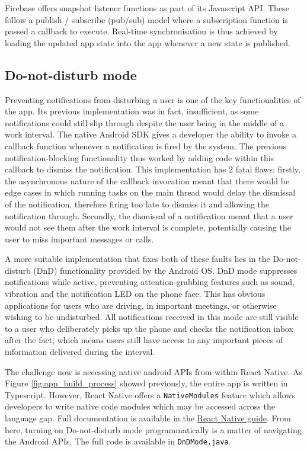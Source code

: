 Firebase offers snapshot listener functions as part of its Javascript API. These follow a publish / subscribe (pub/sub) model where a subscription function is passed a callback to execute. Real-time synchronisation is thus achieved by loading the updated app state into the app whenever a new state is published.

\subsection{Do-not-disturb mode}
Preventing notifications from disturbing a user is one of the key functionalities of the app. Its previous implementation was in fact, insufficient, as some notifications could still slip through despite the user being in the middle of a work interval. The native Android SDK gives a developer the ability to invoke a callback function whenever a notification is fired by the system. The previous notification-blocking functionality thus worked by adding code within this callback to dismiss the notification. This implementation has 2 fatal flaws: firstly, the asynchronous nature of the callback invocation meant that there would be edge cases in which running tasks on the main thread would delay the dismissal of the notification, therefore firing too late to dismiss it and allowing the notification through. Secondly, the dismissal of a notification meant that a user would not see them after the work interval is complete, potentially causing the user to miss important messages or calls.

A more suitable implementation that fixes both of these faults lies in the Do-not-disturb (DnD) functionality provided by the Android OS. DnD mode suppresses notifications while active, preventing attention-grabbing features such as sound, vibration and the notification LED on the phone face. This has obvious applications for users who are driving, in important meetings, or otherwise wishing to be undisturbed. All notifications received in this mode are still visible to a user who deliberately picks up the phone and checks the notification inbox after the fact, which means users still have access to any important pieces of information delivered during the interval.

The challenge now is accessing native android APIs from within React Native. As Figure \ref{fig:app_build_process} showed previously, the entire app is written in Typescript. However, React Native offers a \texttt{NativeModules} feature which allows developers to write native code modules which may be accessed across the language gap. Full documentation is available in the \href{https://reactnative.dev/docs/native-modules-intro}{React Native guide}. From here, turning on Do-not-disturb mode programmatically is a matter of navigating the Android APIs. The full code is available in \texttt{DnDMode.java}.

